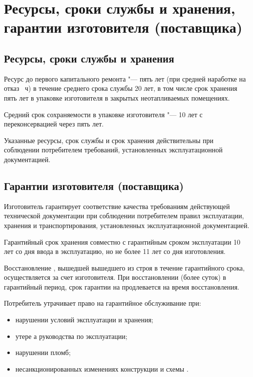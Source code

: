 \newpage

{
\makeatletter
\ifthenelse{\equal{\ESKD@docfont}{14pt}} 
      {\renewcommand{\baselinestretch}{1.20}\selectfont}
      {} 
\makeatother

\section{Ресурсы, сроки службы и хранения, гарантии изготовителя
  (поставщика)}
  \subsection{Ресурсы, сроки службы и хранения}
    Ресурс  до первого капитального ремонта "--- пять 
    лет (при средней наработке на отказ \MTBF~ч) в
    течение среднего срока службы 20 лет, в том числе 
    срок хранения пять лет в упаковке изготовителя в 
    закрытых неотапливаемых помещениях.

    Средний срок сохраняемости в упаковке изготовителя "---
    10 лет с переконсервацией через пять лет.

    Указанные ресурсы, срок службы и срок хранения 
    действительны при соблюдении потребителем требований, 
    установленных эксплуатационной документацией.
    

  \subsection{Гарантии изготовителя (поставщика)}
    Изготовитель гарантирует соответствие качества {\genitivecasename}
    требованиям действующей технической документации при 
    соблюдении потребителем правил эксплуатации, хранения и 
    транспортирования, установленных эксплуатационной документацией.

    Гарантийный срок хранения совместно с гарантийным сроком эксплуатации 
    10 лет со дня ввода в эксплуатацию, но не более 11 лет со дня изготовления.

    Восстановление {\genitivecasename},
    {вышедшей}
    {вышедшего}
    из строя в течение 
    гарантийного срока, осуществляется за счет изготовителя. 
    При восстановлении (более суток) в гарантийный период, срок 
    гарантии на 
    \ifthenelse{\equal{\nameDevice}{\nameDeviceAbbr}}
    {\nameDeviceAbbr}
    {\MakeLowercase{\nameDevice}}
    продлевается на время восстановления.

    Потребитель утрачивает право на гарантийное обслуживание при:
    \begin{itemize}
      \item нарушении условий эксплуатации и хранения;
      \item утере {%
        {\MakeLowercase{\ESKDtheDocName}а}
        {руководства по эксплуатации};}
      \item нарушении пломб;
      \item несанкционированных изменениях конструкции и схемы {\genitivecasename}.
    \end{itemize}
}
